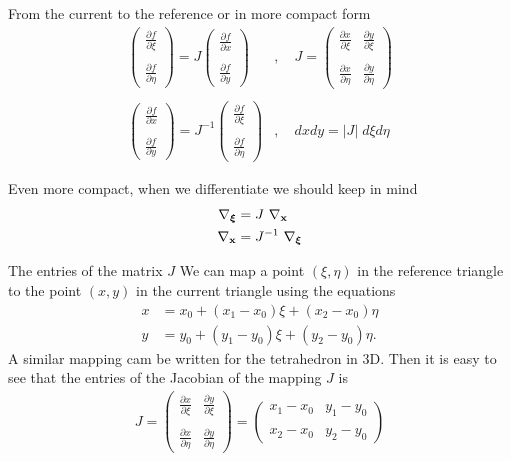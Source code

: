 \documentclass[handout]{beamer}
{
\usepackage{fullpage}
\usepackage{hyperref}
\usepackage{amssymb} 
}
\newcommand{\pmat}[1]{\begin{pmatrix}#1\end{pmatrix}}
\newcommand{\pder}[2]{\frac{\partial #1}{\partial #2}}
\begin{document}
\begin{frame}{From the current to the reference}
or in more compact form
\begin{align*}
\pmat{ \pder{f}{\xi} \\ \\
   \pder{f}{\eta}  
}
=
J
\pmat{ \pder{f}{x} \\ \\
   \pder{f}{y}  
}&, \quad
J=
\pmat{ \pder{x}{\xi}  & \pder{y}{\xi} \\ \\
       \pder{x}{\eta} & \pder{y}{\eta}
}
\\ \\
\pmat{ \pder{f}{x} \\ \\
   \pder{f}{y}  
}
=
J^{-1}
\pmat{ \pder{f}{\xi} \\ \\
   \pder{f}{\eta}  
}&, \quad
dx  dy = |J|\; d\xi  d\eta
\end{align*}

Even more compact, when we differentiate we should keep in mind
\begin{align*}
\nabla_{\boldsymbol \xi} &= J \ \nabla_{\bf x}\\
\nabla_{\bf x} &= J^{-1} \ \nabla_{\boldsymbol \xi}
\end{align*}


\end{frame}

\begin{frame}{The entries of the matrix $J$}
We can map a point $(\xi,\eta)$ in the reference triangle
to the point $(x,y)$ in the current triangle using the 
equations 
\begin{align*}
x   &= x_0 + (x_1 - x_0) \xi + (x_2 - x_0) \eta \\
y   &= y_0 + (y_1 - y_0) \xi + (y_2 - y_0) \eta. 
\end{align*}
A similar mapping cam be written for the tetrahedron in 3D. Then
it is easy to see that the entries of the Jacobian of the mapping $J$ is
\begin{align*}
J=
\pmat{ \pder{x}{\xi}  & \pder{y}{\xi} \\ \\
       \pder{x}{\eta} & \pder{y}{\eta}
}
 = \pmat{ x_1 - x_0 & y_1 - y_0 \\ \\ x_2 - x_0 & y_2 - y_0 }
\end{align*}

\end{frame}
\end{document}
